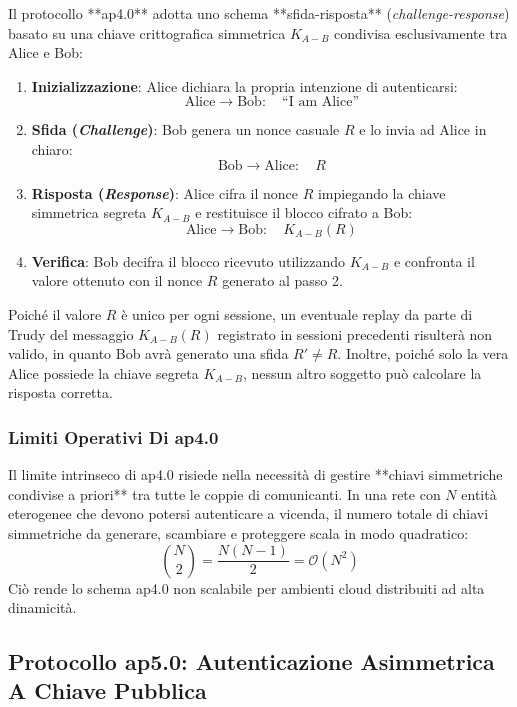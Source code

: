 \documentclass[11pt, a4paper]{article}
\begin{document}
Il protocollo **ap4.0** adotta uno schema **sfida-risposta** (\emph{challenge-response}) basato su una chiave crittografica simmetrica $K_{A-B}$ condivisa esclusivamente tra Alice e Bob:
\begin{enumerate}[leftmargin=*]
    \item \textbf{Inizializzazione}: Alice dichiara la propria intenzione di autenticarsi:
    \[
    \text{Alice} \longrightarrow \text{Bob}: \quad \text{``I am Alice''}
    \]
    \item \textbf{Sfida (\emph{Challenge})}: Bob genera un nonce casuale $R$ e lo invia ad Alice in chiaro:
    \[
    \text{Bob} \longrightarrow \text{Alice}: \quad R
    \]
    \item \textbf{Risposta (\emph{Response})}: Alice cifra il nonce $R$ impiegando la chiave simmetrica segreta $K_{A-B}$ e restituisce il blocco cifrato a Bob:
    \[
    \text{Alice} \longrightarrow \text{Bob}: \quad K_{A-B}(R)
    \]
    \item \textbf{Verifica}: Bob decifra il blocco ricevuto utilizzando $K_{A-B}$ e confronta il valore ottenuto con il nonce $R$ generato al passo 2.
\end{enumerate}

Poiché il valore $R$ è unico per ogni sessione, un eventuale replay da parte di Trudy del messaggio $K_{A-B}(R)$ registrato in sessioni precedenti risulterà non valido, in quanto Bob avrà generato una sfida $R' \neq R$. Inoltre, poiché solo la vera Alice possiede la chiave segreta $K_{A-B}$, nessun altro soggetto può calcolare la risposta corretta.

\subsubsection{Limiti Operativi Di ap4.0}
Il limite intrinseco di ap4.0 risiede nella necessità di gestire **chiavi simmetriche condivise a priori** tra tutte le coppie di comunicanti. In una rete con $N$ entità eterogenee che devono potersi autenticare a vicenda, il numero totale di chiavi simmetriche da generare, scambiare e proteggere scala in modo quadratico:
\[
\binom{N}{2} = \frac{N(N - 1)}{2} = \mathcal{O}(N^2)
\]
Ciò rende lo schema ap4.0 non scalabile per ambienti cloud distribuiti ad alta dinamicità.

\subsection{Protocollo ap5.0: Autenticazione Asimmetrica A Chiave Pubblica}
\end{document}
